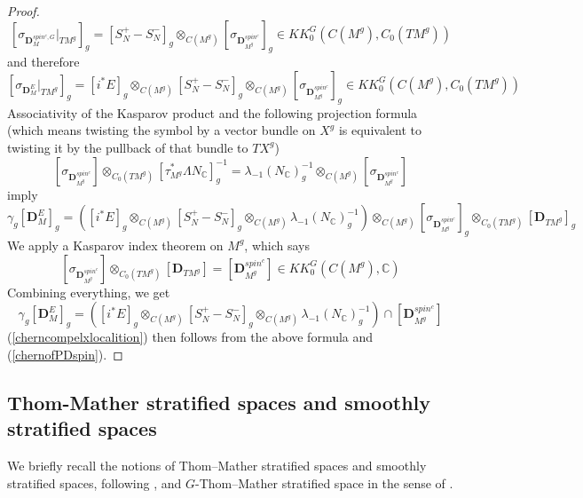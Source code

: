 \documentclass[11pt,leqno,twoside]{amsart}
\theoremstyle{plainsl}
\theoremstyle{definition}
\newcommand{\bD}{\mathbf{D}}
\begin{document}
\begin{proof}
\[
[\sigma_{\bD^{spin^c,G}_M}|_{TM^g}]_g
=
[S^+_N-S^-_N]_g
\otimes_{C(M^g)}
[\sigma_{\bD^{spin^c}_{M^g}}]_g
\in
KK_0^G(C(M^g),C_0(TM^g))
\]
and therefore
\[
[\sigma_{\bD_M^E}|_{TM^g}]_g
=
[i^*E]_g
\otimes_{C(M^g)}
[S^+_N-S^-_N]_g
\otimes_{C(M^g)}
[\sigma_{\bD^{spin^c}_{M^g}}]_g
\in
KK_0^G(C(M^g),C_0(TM^g))
\]
Associativity of the Kasparov product and the following projection formula (which means twisting the symbol by a vector bundle on $X^g$ is equivalent to twisting it by the pullback of that bundle to $TX^g$)
\[
[\sigma_{\bD^{spin^c}_{M^g}}]\otimes_{C_0(TM^g)}[\tau^*_{M^g}\Lambda N_{\mathbb{C}}]^{-1}_g
=
\lambda_{-1}(N_{\mathbb{C}})_g^{-1}\otimes_{C(M^g)}[\sigma_{\bD^{spin^c}_{M^g}}]
\]
imply
\[
\gamma_g[\bD_M^E]_g
=
\left(
[i^*E]_g
\otimes_{C(M^g)}
[S^+_N-S^-_N]_g
\otimes_{C(M^g)}
\lambda_{-1}(N_{\mathbb{C}})_g^{-1}
\right)
\otimes_{C(M^g)}
[\sigma_{\bD^{spin^c}_{M^g}}]_g
\otimes_{C_0(TM^g)}
[\bD_{TM^g}]_g
\]
We apply a Kasparov index theorem \cite[\S4]{HW} on $M^g$, which says
\[
[\sigma_{\bD^{spin^c}_{M^g}}]
\otimes_{C_0(TM^g)}
[\bD_{TM^g}]
=
[\bD^{spin^c}_{M^g}]
\in
KK_0^G(C(M^g),\mathbb{C})
\]
Combining everything, we get
\[
\gamma_g[\bD_M^E]_g
=
\left(
[i^*E]_g
\otimes_{C(M^g)}
[S^+_N-S^-_N]_g
\otimes_{C(M^g)}
\lambda_{-1}(N_{\mathbb{C}})_g^{-1}
\right)
\cap
[\bD^{spin^c}_{M^g}]
\]
(\ref{cherncompelxlocalition}) then follows from the above formula and (\ref{chernofPDspin}).
\end{proof}














\subsection{Thom-Mather stratified spaces and smoothly stratified spaces}



We briefly recall the notions of Thom--Mather stratified spaces
and smoothly stratified spaces, following \cite{ABP1}, and $G$-Thom--Mather stratified space in the sense of \cite{BLP}.
\end{document}
